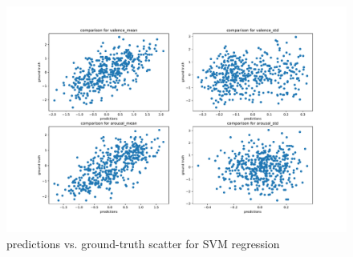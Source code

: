 \begin{figure}
	\centering
	\includegraphics[width=\linewidth]{assets/predictions-scatter.pdf}
	\caption{predictions vs. ground-truth scatter for SVM regression}
	\label{fig:eval-scatter}
\end{figure}


